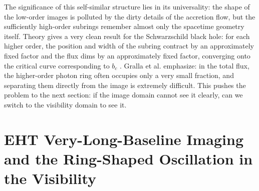The significance of this self-similar structure lies in its universality: the shape of the low-order images is polluted by the dirty details of the accretion flow, but the sufficiently high-order subrings remember almost only the spacetime geometry itself. Theory gives a very clean result for the Schwarzschild black hole: for each higher order, the position and width of the subring contract by an approximately fixed factor and the flux dims by an approximately fixed factor, converging onto the critical curve corresponding to \(b_c\) \citep{2019PhRvD.100b4018G,2020PhRvD.102l4004G,2020SciA....6.1310J}. Gralla et al. emphasize: in the total flux, the higher-order photon ring often occupies only a very small fraction, and separating them directly from the image is extremely difficult. This pushes the problem to the next section: if the image domain cannot see it clearly, can we switch to the visibility domain to see it.

\section{EHT Very-Long-Baseline Imaging and the Ring-Shaped Oscillation in the Visibility}
\label{sec:e19-visibility}

